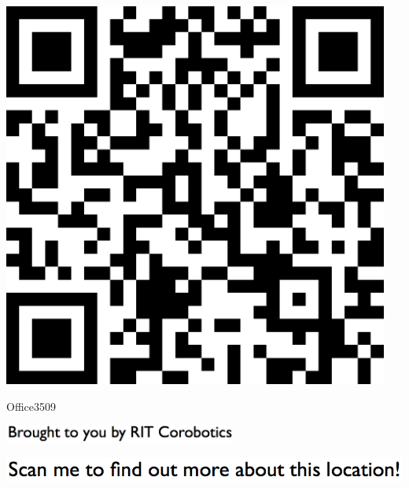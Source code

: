 \documentclass[letterpaper]{article}
\begin{document}
 \begingroup 
 \centerline{\includegraphics[scale=1,width=5in,height=5in]{Office3509.png}} 
 \endgroup 
 \vspace*{\fill} 

 \hfill{\small Office3509} 

  \vspace{0.7in} 
 
 \centerline{\includegraphics[scale=1,width=3in]{text-bottom.png}} 
 
 \pagebreak 
{} 
 \vspace*{\fill} 
 
  \centerline{\includegraphics[scale=1,width=6in]{text-top.png}} 
 
 \vspace{0.5in} 
 
\end{document}
